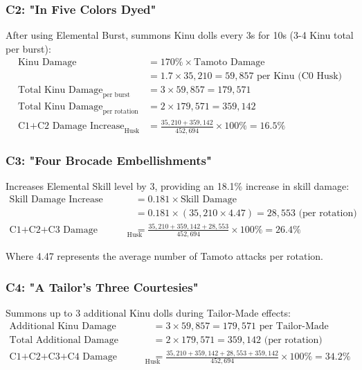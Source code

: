 \documentclass[12pt,a4paper]{article}
\begin{document}
\subsubsection{C2: "In Five Colors Dyed"}
After using Elemental Burst, summons Kinu dolls every 3s for 10s (3-4 Kinu total per burst):
\begin{align}
\text{Kinu Damage} &= 170\% \times \text{Tamoto Damage} \\
&= 1.7 \times 35,210 = 59,857 \text{ per Kinu (C0 Husk)} \\
\text{Total Kinu Damage}_{\text{per burst}} &= 3 \times 59,857 = 179,571 \\
\text{Total Kinu Damage}_{\text{per rotation}} &= 2 \times 179,571 = 359,142 \\
\text{C1+C2 Damage Increase}_{\text{Husk}} &= \frac{35,210 + 359,142}{452,694} \times 100\% = 16.5\%
\end{align}

\subsubsection{C3: "Four Brocade Embellishments"}
Increases Elemental Skill level by 3, providing an 18.1\% increase in skill damage:
\begin{align}
\text{Skill Damage Increase} &= 0.181 \times \text{Skill Damage} \\
&= 0.181 \times (35,210 \times 4.47) = 28,553 \text{ (per rotation)} \\
\text{C1+C2+C3 Damage Increase}_{\text{Husk}} &= \frac{35,210 + 359,142 + 28,553}{452,694} \times 100\% = 26.4\%
\end{align}

Where 4.47 represents the average number of Tamoto attacks per rotation.

\subsubsection{C4: "A Tailor's Three Courtesies"}
Summons up to 3 additional Kinu dolls during Tailor-Made effects:
\begin{align}
\text{Additional Kinu Damage} &= 3 \times 59,857 = 179,571 \text{ per Tailor-Made} \\
\text{Total Additional Damage} &= 2 \times 179,571 = 359,142 \text{ (per rotation)} \\
\text{C1+C2+C3+C4 Damage Increase}_{\text{Husk}} &= \frac{35,210 + 359,142 + 28,553 + 359,142}{452,694} \times 100\% = 34.2\%
\end{align}
\end{document}
